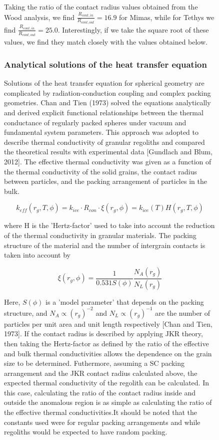 \documentclass[11pt]{article} %
\begin{document}
\begin{figure}[ht]
\begin{Table}
	
	Taking the ratio of the contact radius values obtained from the Wood analysis, we find $\frac{R_{cont,in}}{R_{cont,out}} = 16.9$ for Mimas, while for Tethys we find $\frac{R_{cont,in}}{R_{cont,out}} = 25.0$. Interestingly, if we take the square root of these values, we find they match closely with the values obtained below.
	
\subsubsection{Analytical solutions of the heat transfer equation}

	Solutions of the heat transfer equation for spherical geometry are complicated by radiation-conduction coupling and complex packing geometries. Chan and Tien (1973) solved the equations analytically and derived explicit functional relationships between the thermal conductance of regularly packed spheres under vacuum and fundamental system parameters. This approach was adopted to describe thermal conductivity of granular regoliths and compared the theoretical results with experimental data [Gundlach and Blum, 2012]. The effective thermal conductivity was given as a function of the thermal conductivity of the solid grains, the contact radius between particles, and the packing arrangement of particles in the bulk.
	
	\begin{equation}
	k_{eff}(r_{g}, T, \phi) = k_{ice}\cdot R_{con} \cdot \xi(r_{g}, \phi)= k_{ice}(T) H(r_{g},T, \phi)
	\end{equation}

	where H is the 'Hertz-factor' used to take into account the reduction of the thermal conductivity in granular materials. The packing structure of the material and the number of intergrain contacts is taken into account by

	\begin{equation}
	\xi(r_{g}, \phi) = \frac{1}{0.531 S(\phi)} \frac{N_{A}(r_{g})}{N_{L}(r_{g})}
	\end{equation}

	Here, $S(\phi)$ is a 'model parameter' that depends on the packing structure, and $N_{A} \varpropto (r_{g})^{-2}$ and $N_{L} \varpropto (r_{g})^{-1}$ are the number of particles per unit area and unit length respectively [Chan and Tien, 1973]. If the contact radius is described by applying JKR theory, then taking the Hertz-factor as defined by the ratio of the effective and bulk thermal conductivities allows the dependence on the grain size to be determined. Futhermore, assuming a SC packing arrangement and the JKR contact radius calculated above, the expected thermal conductivity of the regolith can be calculated. In this case, calculating the ratio of the contact radius inside and outside the anomalous region is as simple as calculating the ratio of the effective thermal conductivities.It should be noted that the constants used were for regular packing arrangements and while regoliths would be expected to have random packing.
	

\end{Table}
\end{figure}
\end{document}
